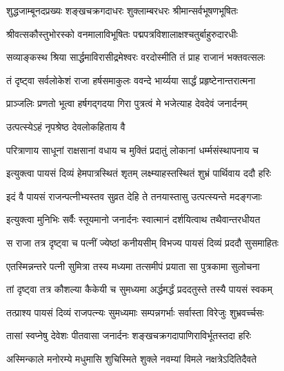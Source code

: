 \twolineshloka
{शुद्धजाम्बूनदप्रख्यः शङ्खचक्रगदाधरः}
{शुक्लाम्बरधरः श्रीमान्सर्वभूषणभूषितः}%

\twolineshloka
{श्रीवत्सकौस्तुभोरस्को वनमालाविभूषितः}
{पद्मपत्रविशालाक्षश्चतुर्बाहुरुदारधीः}%

\twolineshloka
{सव्याङ्कस्थ श्रिया सार्द्धमाविरासीद्रमेश्वरः}
{वरदोस्मीति तं प्राह राजानं भक्तवत्सलः}%

\twolineshloka
{तं दृष्ट्वा सर्वलोकेशं राजा हर्षसमाकुलः}
{ववन्दे भार्य्यया सार्द्धं प्रहृष्टेनान्तरात्मना}%

\twolineshloka
{प्राञ्जलिः प्रणतो भूत्वा हर्षगद्गदया गिरा}
{पुत्रत्वं मे भजेत्याह देवदेवं जनार्दनम्}%


\onelineshloka
{उत्पत्स्येऽहं नृपश्रेष्ठ देवलोकहिताय वै}%

\twolineshloka
{परित्राणाय साधूनां राक्षसानां वधाय च}
{मुक्तिं प्रदातुं लोकानां धर्म्मसंस्थापनाय च}%


\twolineshloka
{इत्युक्त्वा पायसं दिव्यं हेमपात्रस्थितं शृतम्}
{लक्ष्म्याहस्तस्थितं शुभ्रं पार्थिवाय ददौ हरिः}%


\twolineshloka
{इदं वै पायसं राजन्पत्नीभ्यस्तव सुव्रत}
{देहि ते तनयास्तासु उत्पत्स्यन्ते मदङ्गजाः}%


\twolineshloka
{इत्युक्त्वा मुनिभिः सर्वैः स्तूयमानो जनार्दनः}
{स्वात्मानं दर्शयित्वाथ तथैवान्तरधीयत}%

\twolineshloka
{स राजा तत्र दृष्ट्वा च पत्नीं ज्येष्ठां कनीयसीम्}
{विभज्य पायसं दिव्यं प्रददौ सुसमाहितः}%

\twolineshloka
{एतस्मिन्नन्तरे पत्नी सुमित्रा तस्य मध्यमा}
{तत्समीपं प्रयाता सा पुत्रकामा सुलोचना}%

\twolineshloka
{तां दृष्ट्वा तत्र कौशल्या कैकेयी च सुमध्यमा}
{अर्द्धमर्द्धं प्रददतुस्ते तस्यै पायसं स्वकम्}%

\twolineshloka
{तत्प्राश्य पायसं दिव्यं राजपत्न्यः सुमध्यमाः}
{सम्पन्नगर्भाः सर्वास्ता विरेजुः शुभ्रवर्च्चसः}%

\twolineshloka
{तासां स्वप्नेषु देवेशः पीतवासा जनार्दनः}
{शङ्खचक्रगदापाणिराविर्भूतस्तदा हरिः}%

\twolineshloka
{अस्मिन्काले मनोरम्ये मधुमासि शुचिस्मिते}
{शुक्ले नवम्यां विमले नक्षत्रेऽदितिदैवते}%

